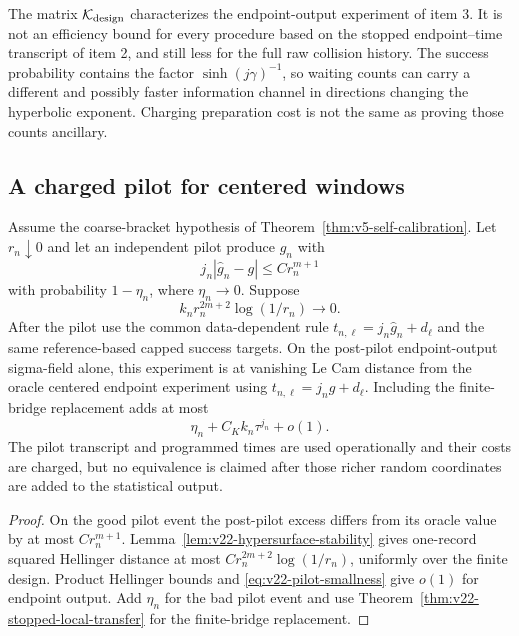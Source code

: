 \begin{remark}
\label{rem:v22-endpoint-coarsening}
The matrix $\mathcal K_{\rm design}$ characterizes the endpoint-output
experiment of item 3.  It is not an efficiency bound for every procedure
based on the stopped endpoint--time transcript of item 2, and still less for
the full raw collision history.  The success probability contains the factor
$\sinh(j\gamma)^{-1}$, so waiting counts can carry a different and possibly
faster information channel in directions changing the hyperbolic exponent.
Charging preparation cost is not the same as proving those counts ancillary.
\end{remark}

\subsection{A charged pilot for centered windows}

\begin{corollary}
\label{cor:v22-pilot-centered}
Assume the coarse-bracket hypothesis of
Theorem~\ref{thm:v5-self-calibration}.  Let $r_n\downarrow0$ and let an
independent pilot produce $\widehat g_n$ with
\[
 j_n|\widehat g_n-g|\le Cr_n^{m+1}
\]
with probability $1-\eta_n$, where $\eta_n\to0$.  Suppose
\begin{equation}\label{eq:v22-pilot-smallness}
 k_nr_n^{2m+2}\log(1/r_n)\longrightarrow0.
\end{equation}
After the pilot use the common data-dependent rule
$t_{n,\ell}=j_n\widehat g_n+d_\ell$ and the same reference-based capped
success targets.  On the post-pilot endpoint-output sigma-field alone, this
experiment is at vanishing Le Cam distance from the oracle centered endpoint
experiment using $t_{n,\ell}=j_ng+d_\ell$.  Including the finite-bridge
replacement adds at most
\begin{equation}\label{eq:v22-pilot-total-error}
                    \eta_n+C_Kk_n\tau^{j_n}+o(1).
\end{equation}
The pilot transcript and programmed times are used operationally and their
costs are charged, but no equivalence is claimed after those richer random
coordinates are added to the statistical output.
\end{corollary}

\begin{proof}
On the good pilot event the post-pilot excess differs from its oracle value by
at most $Cr_n^{m+1}$.  Lemma~\ref{lem:v22-hypersurface-stability} gives
one-record squared Hellinger distance at most
$Cr_n^{2m+2}\log(1/r_n)$, uniformly over the finite design.  Product
Hellinger bounds and \eqref{eq:v22-pilot-smallness} give $o(1)$ for endpoint
output.  Add $\eta_n$ for the bad pilot event and use
Theorem~\ref{thm:v22-stopped-local-transfer} for the finite-bridge
replacement.
\end{proof}

